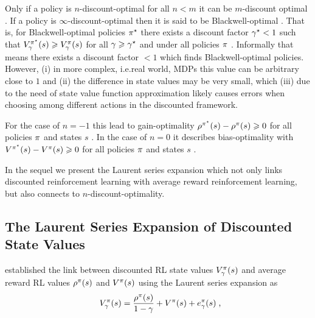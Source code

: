 \documentclass[envcountsame]{llncs}
\begin{document}
Only if a policy is \(n\)-discount-optimal for all \(n < m\) it can be \(m\)-discount
optimal \citep{Puterman94,Veinott69}.
%
If a policy is \(\infty\)-discount-optimal then it is said to be Blackwell-optimal
\citep{Blackwell62}.
That is, for Blackwell-optimal policies \(\pi^{\star}\) there exists a discount factor \(\gamma^{\star} < 1\)
such that \(V_{\gamma}^{\pi^{\star}}(s) \geqslant V_{\gamma}^{\pi}(s)\) for all
\(\gamma \geqslant \gamma^{\star}\) and under all policies \(\pi\)
\citep{Mahadevan96_SensitiveDiscountOptimalityUnifyingDiscountedAndAverageRewardReinforcementLearning,Blackwell62}.
Informally that means there exists a discount factor \(<1\) which finds Blackwell-optimal policies.
However, (i) in more complex, i.e.\@ real world, MDPs this value can be arbitrary close to \(1\) and
(ii) the difference in state values may be very small, which (iii) due to the need of state value
function approximation likely causes errors when choosing among different actions in the discounted
framework.


For the case of \(n=-1\) this lead to gain-optimality
\(\rho^{\pi^{\star}}(s) - \rho^{\pi}(s) \geqslant 0\) for all policies \(\pi\) and states \(s\)
\citep{Mahadevan96_AnAveragerewardReinforcementLearningAlgorithmForComputingBiasoptimalPolicies}. In
the case of \(n=0\) it describes bias-optimality with \(V^{\pi^{\star}}(s) - V^{\pi}(s) \geqslant 0\)
for all policies \(\pi\) and states \(s\)
\citep{Mahadevan96_AnAveragerewardReinforcementLearningAlgorithmForComputingBiasoptimalPolicies}.
%


In the sequel we present the Laurent series expansion which not only links discounted reinforcement
learning with average reward reinforcement learning, but also connects to \(n\)-discount-optimality.



\subsection{The Laurent Series Expansion of Discounted State Values}
\label{subsec:The_Laurent_Series_Expansion_of_Discounted_State_Values}


\cite{MillerVeinott1969} established the link between discounted RL state values
\(V_{\gamma}^{\pi}(s)\) and average reward RL values \(\rho^{\pi}(s)\) and \(V^{\pi}(s)\)
using the Laurent series expansion as
\begin{align*}
  V_{\gamma}^{\pol}(s) = \frac{\avgrew^{\pol}(s)}{1-\gamma} + V^{\pol}(s) + e_{\gamma}^{\pol}(s) \tcom
\end{align*}
\end{document}
